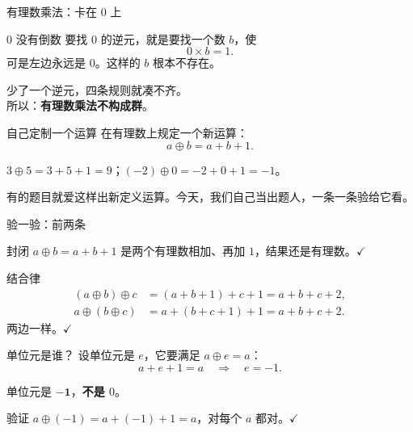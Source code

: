 \documentclass[10pt]{beamer}
\begin{document}
\begin{frame}{有理数乘法：卡在 0 上}
  \begin{block}{\(0\) 没有倒数}
    要找 \(0\) 的逆元，就是要找一个数 \(b\)，使
    \[
      0\times b=1 .
    \]
    可是左边永远是 \(0\)。这样的 \(b\) 根本不存在。
  \end{block}
  \pause
  \begin{center}
    {\large 少了一个逆元，四条规则就凑不齐。}\\[0.5em]
    \pause
    {\large 所以：\textbf{有理数乘法不构成群}。}
  \end{center}
\end{frame}

\begin{frame}{自己定制一个运算}
  在有理数上规定一个新运算：
  \[
    a\oplus b = a+b+1 .
  \]
  \pause
  \begin{example}
    \(3\oplus5=3+5+1=9\)；\quad \((-2)\oplus0=-2+0+1=-1\)。
  \end{example}
  \pause
  有的题目就爱这样出新定义运算。\pause 今天，我们自己当出题人，一条一条验给它看。
\end{frame}

\begin{frame}{验一验：前两条}
  \begin{block}{封闭}
    \(a\oplus b=a+b+1\) 是两个有理数相加、再加 \(1\)，结果还是有理数。\quad \(\checkmark\)
  \end{block}
  \pause
  \begin{block}{结合律}
    \begin{align*}
      (a\oplus b)\oplus c &= (a+b+1)+c+1 = a+b+c+2,\\
      a\oplus(b\oplus c) &= a+(b+c+1)+1 = a+b+c+2 .
    \end{align*}
    两边一样。\quad \(\checkmark\)
  \end{block}
\end{frame}

\begin{frame}{单位元是谁？}
  设单位元是 \(e\)，它要满足 \(a\oplus e=a\)：
  \[
    a+e+1=a \quad\Longrightarrow\quad e=-1 .
  \]
  \pause
  \begin{center}
    {\large 单位元是 \(\mathbf{-1}\)，\textbf{不是 \(0\)}。}
  \end{center}
  \pause
  \begin{block}{验证}
    \(a\oplus(-1)=a+(-1)+1=a\)，对每个 \(a\) 都对。\quad \(\checkmark\)
  \end{block}
\end{frame}
\end{document}
